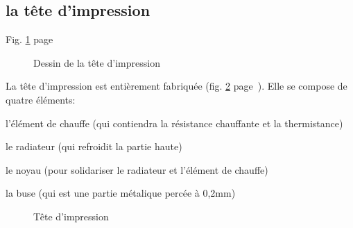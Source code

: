 \subsection{la tête d'impression}
Fig. \ref{sch_tete} page~\pageref{sch_tete} \par %
\begin{figure}%
   \caption{\label{sch_tete} Dessin de la tête d'impression}%
\end{figure}%
La tête d'impression est entièrement fabriquée (fig. \ref{tete_impression} %
page~\pageref{tete_impression}). Elle se compose de quatre éléments:%
\begin{dinglist}{71}%
\item{l'élément de chauffe (qui contiendra la résistance chauffante et la thermistance)}%
\item{le radiateur (qui refroidit la partie haute)}%
\item{le noyau (pour solidariser le radiateur et l'élément de chauffe)}%
\item{la buse (qui est une partie métalique percée à 0,2mm)}%
\end{dinglist}%
\begin{figure}%
   \caption{\label{tete_impression} Tête d'impression}%
\end{figure}%
